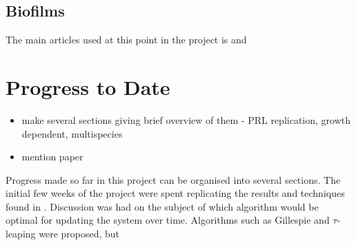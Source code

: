 \documentclass[a4paper,12pt]{article}
\begin{document}
\subsection{Biofilms}

The main articles used at this point in the project is \cite{bioref:PRL-drugGradients} and \cite{bioref:Greulich-growthDependentAntibiotics}





% 
% 
% 

\section{Progress to Date}

\begin{itemize}
 \item make several sections giving brief overview of them - PRL replication, growth dependent, multispecies 
 \item mention paper
\end{itemize}


Progress made so far in this project can be organised into several sections.  The initial few weeks of the project 
were spent replicating the results and techniques found in \cite{bioref:PRL-drugGradients}.  Discussion was had
on the subject of which algorithm would be optimal for updating the system over time.  Algorithms such as Gillespie\cite{bioref:Gillespie-algorithm} 
and $\tau$-leaping \cite{bioref:tau-leap-algorithm} were proposed, but 
\end{document}
